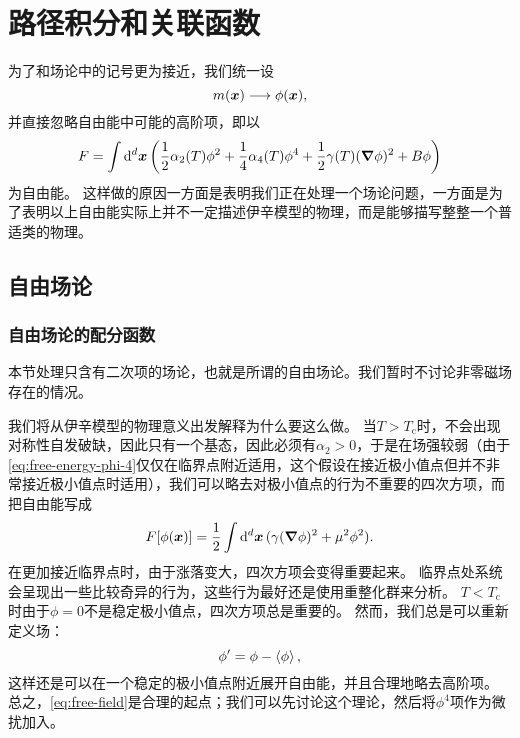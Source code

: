 \documentclass[hyperref, UTF8, a4paper]{ctexart}
\begin{document}
\section{路径积分和关联函数}\label{sec:path-integral}

为了和场论中的记号更为接近，我们统一设
\[
    m(\vb*{x}) \longrightarrow \phi(\vb*{x}),
\]
并直接忽略自由能中可能的高阶项，即以
\begin{equation}
    F = \int \dd[d]{\vb*{x}} \left( \frac{1}{2} \alpha_2(T) \phi^2 + \frac{1}{4} \alpha_4(T) \phi^4 + \frac{1}{2} \gamma(T) (\grad{\phi})^2 + B \phi \right)
    \label{eq:free-energy-phi-4}
\end{equation}
为自由能。
这样做的原因一方面是表明我们正在处理一个场论问题，一方面是为了表明以上自由能实际上并不一定描述伊辛模型的物理，而是能够描写整整一个普适类的物理。

\subsection{自由场论}\label{sec:free-theory}

\subsubsection{自由场论的配分函数}\label{sec:free-field-theory-partition-function}

本节处理只含有二次项的场论，也就是所谓的自由场论。我们暂时不讨论非零磁场存在的情况。

我们将从伊辛模型的物理意义出发解释为什么要这么做。
当$T>T_\text{c}$时，不会出现对称性自发破缺，因此只有一个基态，因此必须有$\alpha_2 > 0$，于是在场强较弱（由于\eqref{eq:free-energy-phi-4}仅仅在临界点附近适用，这个假设在接近极小值点但并不非常接近极小值点时适用），我们可以略去对极小值点的行为不重要的四次方项，而把自由能写成
\begin{equation}
    F[\phi(\vb*{x})] = \frac{1}{2} \int \dd[d]{\vb*{x}} (\gamma (\grad{\phi})^2 + \mu^2 \phi^2).
    \label{eq:free-field}
\end{equation}
在更加接近临界点时，由于涨落变大，四次方项会变得重要起来。
临界点处系统会呈现出一些比较奇异的行为，这些行为最好还是使用重整化群来分析。
$T<T_\text{c}$时由于$\phi=0$不是稳定极小值点，四次方项总是重要的。
然而，我们总是可以重新定义场：
\[
    \phi' = \phi - \expval{\phi},
\]
这样还是可以在一个稳定的极小值点附近展开自由能，并且合理地略去高阶项。
总之，\eqref{eq:free-field}是合理的起点；我们可以先讨论这个理论，然后将$\phi^4$项作为微扰加入。
\end{document}
